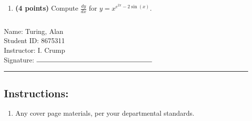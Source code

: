 \documentclass[12pt]{amsart}
\begin{document}
\begin{enumerate}
\vfill 
\def \varexp{2}\def \newexp{1}\def \trigcoeff{-2}\def \trigval{-2}\def \oppval{+2}
\item {\bf (4 points)} 
 Compute $\frac{dy}{dx}$ for $y=x^{e^{\varexp x} \trigval \sin(x)}$.

\vfill 
\newpage  $ $   \newpage\end{enumerate}\graphicspath{{C:/Users/iainc/anaconda3/Randomizer/MATH 1001/Midterm 1/}}\setcounter{page}{1}


\thispagestyle{fancy}

 \noindent Name: Turing, Alan \vspace{.3cm} \\\noindent Student ID: 8675311 \vspace{.3cm} \\\noindent Instructor: I. Crump \vspace{.3cm} \\\noindent Signature: $\rule{6cm}{0.15mm}$ \vspace{.3cm} \\ 



\vspace{.4cm}


\vspace{.4cm}

\hrule

\subsection*{Instructions:} \begin{enumerate}[1.]
\item Any cover page materials, per your departmental standards.
\end{enumerate}
\end{document}
